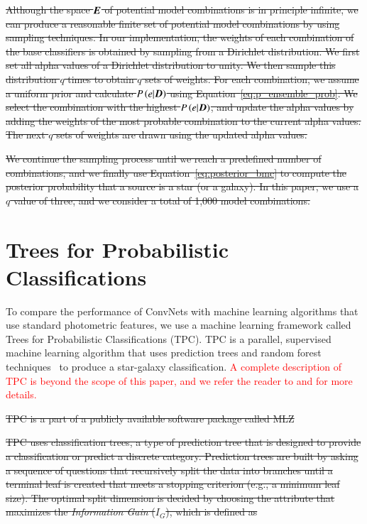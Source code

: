 \documentclass[fleqn,usenatbib]{mnras}
\newcommand{\eg}{{e.g., }}
\newcommand{\changed}[1]{\textcolor{red}{#1}}
\begin{document}
\sout{Although the space $\bmath{E}$ of potential model combinations is in principle infinite, we can produce a reasonable finite set of potential model combinations by using sampling techniques.  In our implementation, the weights of each combination of the base classifiers is obtained by sampling from a Dirichlet distribution.  We first set all alpha values of a Dirichlet distribution to unity.  We then sample this distribution $q$ times to obtain $q$ sets of weights.  For each combination, we assume a uniform prior and calculate $P\left(e|\bmath{D}\right)$ using Equation~\ref{eq:p_ensemble_prob}.  We select the combination with the highest $P\left(e|\bmath{D}\right)$, and update the alpha values by adding the weights of the most probable combination to the current alpha values.  The next $q$ sets of weights are drawn using the updated alpha values.}

\sout{We continue the sampling process until we reach a predefined number of combinations, and we finally use Equation~\ref{eq:posterior_bmc} to compute the posterior probability that a source is a star (or a galaxy).  In this paper, we use a $q$ value of three, and we consider a total of 1,000 model combinations.}

\section{Trees for Probabilistic Classifications}
  \label{sec:tpc}

To compare the performance of ConvNets with
machine learning algorithms that use standard photometric features,
we use a machine learning framework called
Trees for Probabilistic Classifications (TPC).
TPC is a parallel, supervised machine learning algorithm
that uses prediction trees and random forest 
techniques~\citep{breiman1984classification, breiman2001random}
to produce a star-galaxy classification.
\changed{
A complete description of TPC is beyond the scope of this paper, and
we refer the reader to
\cite{carrascokind2013tpz} and \cite{kim2015hybrid} for more details.
}

\sout{ TPC is a part of a publicly available software package called \textsc{MLZ}%
}

\sout{ TPC uses classification trees, a type of prediction tree that is designed to provide a classification or predict a discrete category.  Prediction trees are built by asking a sequence of questions that recursively split the data into branches until a terminal leaf is created that meets a stopping criterion (\eg a minimum leaf size).  The optimal split dimension is decided by choosing the attribute that maximizes the \textit{Information Gain} ($I_G$), which is defined as }
\end{document}
